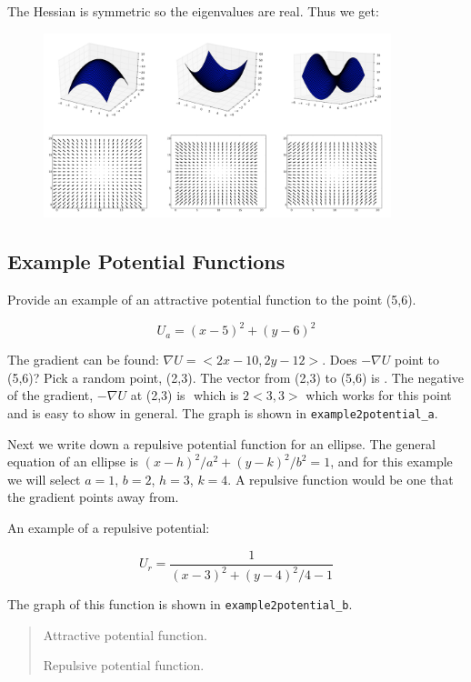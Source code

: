 The Hessian is symmetric so the eigenvalues are real. Thus we get:

\begin{figure}
\centering
\includegraphics[width=0.9\textwidth,height=\textheight]{PlanningFigures/gradient_figures.png}
\caption{}
\end{figure}

\hypertarget{example-potential-functions}{%
\subsection{Example Potential
Functions}\label{example-potential-functions}}

Provide an example of an attractive potential function to the point
(5,6).

\[U_a = (x-5)^2 +(y-6)^2\]

The gradient can be found: \(\nabla U =<2x-10, 2y-12>\). Does
\(-\nabla U\) point to (5,6)? Pick a random point, (2,3). The vector
from (2,3) to (5,6) is \(<3,3>\). The negative of the gradient,
\(-\nabla U\) at (2,3) is \(<6,6>\) which is \(2<3,3>\) which works for
this point and is easy to show in general. The graph is shown in
\texttt{example2potential\_a}.

Next we write down a repulsive potential function for an ellipse. The
general equation of an ellipse is \((x-h)^2/a^2 + (y-k)^2/b^2 = 1\), and
for this example we will select \(a=1\), \(b=2\), \(h=3\), \(k=4\). A
repulsive function would be one that the gradient points away from.

An example of a repulsive potential:

\[U_r = \frac{1}{ (x-3)^2 + (y-4)^2/4 - 1}\]

The graph of this function is shown in \texttt{example2potential\_b}.

\begin{quote}
Attractive potential function.

Repulsive potential function.
\end{quote}

